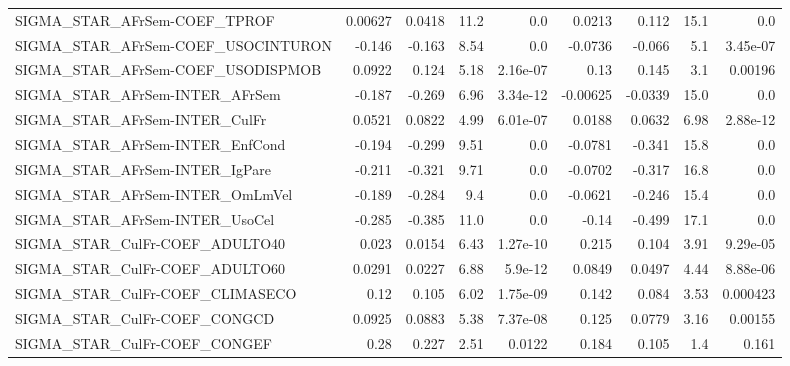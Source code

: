\begin{tabular}{lrrrrrrrr}
SIGMA\_STAR\_AFrSem-COEF\_TPROF          &     0.00627 &       0.0418 &    11.2 &      0.0 &     0.0213 &       0.112 &         15.1 &           0.0 \\
SIGMA\_STAR\_AFrSem-COEF\_USOCINTURON    &      -0.146 &       -0.163 &    8.54 &      0.0 &    -0.0736 &      -0.066 &          5.1 &      3.45e-07 \\
SIGMA\_STAR\_AFrSem-COEF\_USODISPMOB     &      0.0922 &        0.124 &    5.18 & 2.16e-07 &       0.13 &       0.145 &          3.1 &       0.00196 \\
SIGMA\_STAR\_AFrSem-INTER\_AFrSem        &      -0.187 &       -0.269 &    6.96 & 3.34e-12 &   -0.00625 &     -0.0339 &         15.0 &           0.0 \\
SIGMA\_STAR\_AFrSem-INTER\_CulFr         &      0.0521 &       0.0822 &    4.99 & 6.01e-07 &     0.0188 &      0.0632 &         6.98 &      2.88e-12 \\
SIGMA\_STAR\_AFrSem-INTER\_EnfCond       &      -0.194 &       -0.299 &    9.51 &      0.0 &    -0.0781 &      -0.341 &         15.8 &           0.0 \\
SIGMA\_STAR\_AFrSem-INTER\_IgPare        &      -0.211 &       -0.321 &    9.71 &      0.0 &    -0.0702 &      -0.317 &         16.8 &           0.0 \\
SIGMA\_STAR\_AFrSem-INTER\_OmLmVel       &      -0.189 &       -0.284 &     9.4 &      0.0 &    -0.0621 &      -0.246 &         15.4 &           0.0 \\
SIGMA\_STAR\_AFrSem-INTER\_UsoCel        &      -0.285 &       -0.385 &    11.0 &      0.0 &      -0.14 &      -0.499 &         17.1 &           0.0 \\
SIGMA\_STAR\_CulFr-COEF\_ADULTO40        &       0.023 &       0.0154 &    6.43 & 1.27e-10 &      0.215 &       0.104 &         3.91 &      9.29e-05 \\
SIGMA\_STAR\_CulFr-COEF\_ADULTO60        &      0.0291 &       0.0227 &    6.88 &  5.9e-12 &     0.0849 &      0.0497 &         4.44 &      8.88e-06 \\
SIGMA\_STAR\_CulFr-COEF\_CLIMASECO       &        0.12 &        0.105 &    6.02 & 1.75e-09 &      0.142 &       0.084 &         3.53 &      0.000423 \\
SIGMA\_STAR\_CulFr-COEF\_CONGCD          &      0.0925 &       0.0883 &    5.38 & 7.37e-08 &      0.125 &      0.0779 &         3.16 &       0.00155 \\
SIGMA\_STAR\_CulFr-COEF\_CONGEF          &        0.28 &        0.227 &    2.51 &   0.0122 &      0.184 &       0.105 &          1.4 &         0.161 \\

\end{tabular}
